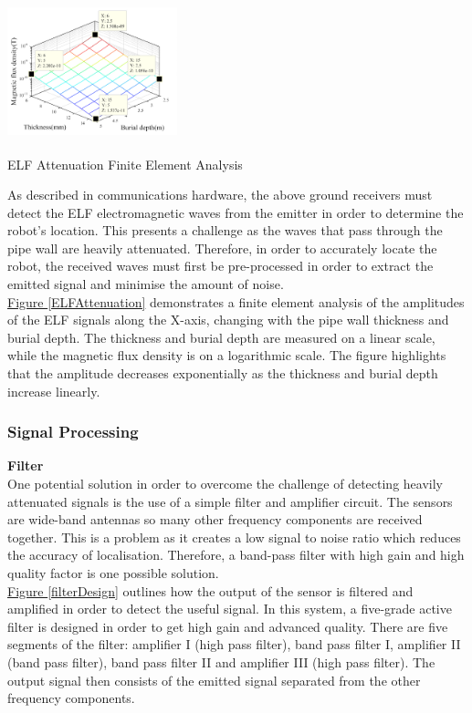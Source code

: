 \documentclass[11pt]{article}		%
\newcommand{\supercite}[1]{\textsuperscript{\cite{#1}}}		%
\newcommand{\figref}[1]{\hyperref[#1]{Figure \ref*{#1}}}    %
\begin{document}
		    \begin{floatingfigure}[r]{0.4\textwidth}
				\centering
				\includegraphics[width = 0.37\textwidth]{Attenuation}
				\caption{ELF Attenuation Finite Element Analysis \supercite{FDT}}
				\label{ELFAttenuation}
			\end{floatingfigure}
			As described in communications hardware, the above ground receivers must detect the ELF electromagnetic waves from the emitter in order to determine the robot's location.
			This presents a challenge as the waves that pass through the pipe wall are heavily attenuated. 
			Therefore, in order to accurately locate the robot, the received waves must first be pre-processed in order to extract the emitted signal and minimise the amount of noise.
			\\	    
		    \hspace*{3ex}\figref{ELFAttenuation}  demonstrates a finite element analysis of the amplitudes of the ELF signals along the X-axis, changing with the pipe wall thickness and burial depth.
		    The thickness and burial depth are measured on a linear scale, while the magnetic flux density is on a logarithmic scale.
		    The figure highlights that the amplitude decreases exponentially as the thickness and burial depth increase linearly.

			\subsubsection{Signal Processing}
			
		    \begin{floatingfigure}[r]{0pt} \end{floatingfigure}
		    
			\textbf{Filter} \\
	        One potential solution in order to overcome the challenge of detecting heavily attenuated signals is the use of a simple filter and amplifier circuit.
	        The sensors are wide-band antennas so many other frequency components are received together. This is a problem as it creates a low signal to noise ratio which reduces the accuracy of localisation.
	        Therefore, a band-pass filter with high gain and high quality factor is one possible solution.
	        \\
	        \hspace*{3ex}\figref{filterDesign} outlines how the output of the sensor is filtered and amplified in order to detect the useful signal. 
	        In this system, a five-grade active filter is designed in order to get high gain and advanced quality. There are five segments of the filter: amplifier I (high pass filter), band pass filter I, amplifier II (band pass filter), band pass filter II and amplifier III (high pass filter).
	        The output signal then consists of the emitted signal separated from the other frequency components. 
	        
\end{document}
